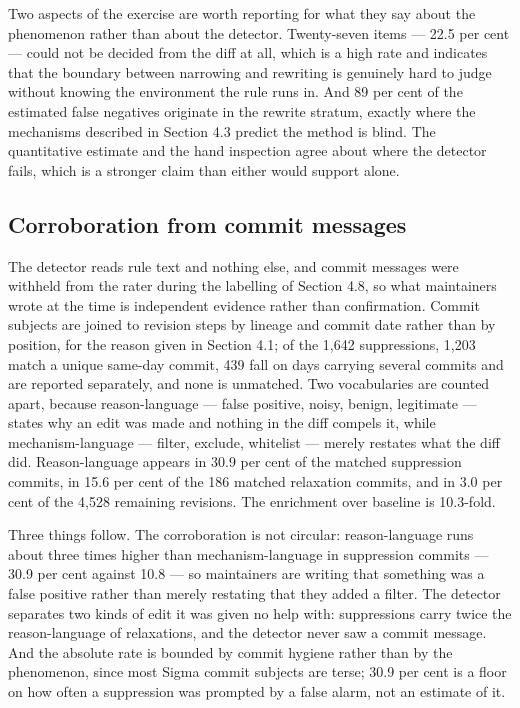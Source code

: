 Two aspects of the exercise are worth reporting for what they say about the phenomenon rather than about the detector. Twenty-seven items --- 22.5 per cent --- could not be decided from the diff at all, which is a high rate and indicates that the boundary between narrowing and rewriting is genuinely hard to judge without knowing the environment the rule runs in. And 89 per cent of the estimated false negatives originate in the rewrite stratum, exactly where the mechanisms described in Section 4.3 predict the method is blind. The quantitative estimate and the hand inspection agree about where the detector fails, which is a stronger claim than either would support alone.

\subsection{Corroboration from commit messages}

The detector reads rule text and nothing else, and commit messages were withheld from the rater during the labelling of Section 4.8, so what maintainers wrote at the time is independent evidence rather than confirmation. Commit subjects are joined to revision steps by lineage and commit date rather than by position, for the reason given in Section 4.1; of the 1,642 suppressions, 1,203 match a unique same-day commit, 439 fall on days carrying several commits and are reported separately, and none is unmatched. Two vocabularies are counted apart, because reason-language --- false positive, noisy, benign, legitimate --- states why an edit was made and nothing in the diff compels it, while mechanism-language --- filter, exclude, whitelist --- merely restates what the diff did. Reason-language appears in 30.9 per cent of the matched suppression commits, in 15.6 per cent of the 186 matched relaxation commits, and in 3.0 per cent of the 4,528 remaining revisions. The enrichment over baseline is 10.3-fold.

Three things follow. The corroboration is not circular: reason-language runs about three times higher than mechanism-language in suppression commits --- 30.9 per cent against 10.8 --- so maintainers are writing that something was a false positive rather than merely restating that they added a filter. The detector separates two kinds of edit it was given no help with: suppressions carry twice the reason-language of relaxations, and the detector never saw a commit message. And the absolute rate is bounded by commit hygiene rather than by the phenomenon, since most Sigma commit subjects are terse; 30.9 per cent is a floor on how often a suppression was prompted by a false alarm, not an estimate of it.

